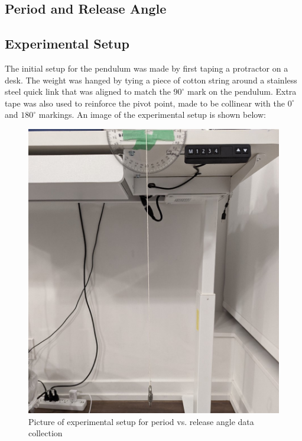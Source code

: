 \documentclass[11pt]{article}
\begin{document}
\begin{multicols}{2}
\section{Period and Release Angle} \label{sec 3 period and release angle}

\subsection{Experimental Setup}
The initial setup for the pendulum was made by first taping a protractor on a desk. The weight was hanged by tying a piece of cotton string around a stainless steel quick link that was aligned to match the $90^{\circ}$ mark on the pendulum. Extra tape was also used to reinforce the pivot point, made to be collinear with the $0^{\circ}$ and $180^{\circ}$ markings. An image of the experimental setup is shown below:

\begin{figure}[H]
    \centering
    \includegraphics[width=\linewidth]{../figures/exp_setup1.jpg}
    \caption{\centering Picture of experimental setup for period vs. release angle data collection}
    \label{fig:figure 1}
\end{figure}



\end{multicols}
\end{document}
